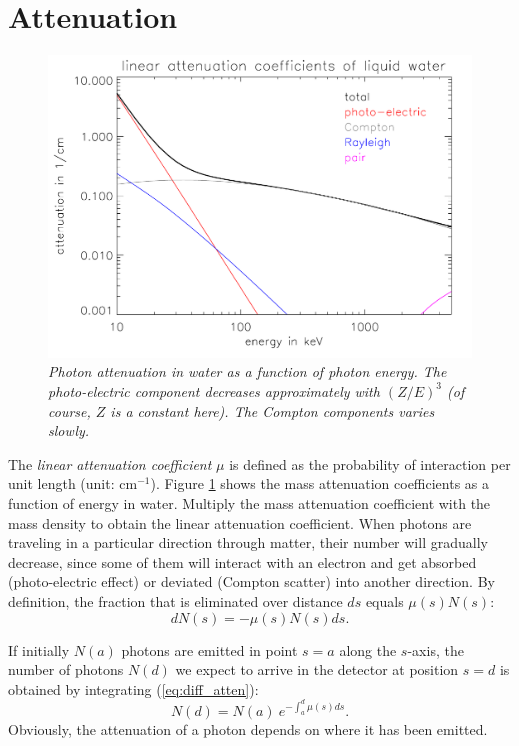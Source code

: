 \section{Attenuation}

\begin{figure}[tb]
\centering
\includegraphics[width=\figmedium]{figs/fig_atten_water.pdf}
\caption{\label{fig:atten_water} \emph{Photon attenuation in water as a
function of photon energy. The photo-electric component decreases
approximately with $(Z/E)^3$ (of course, $Z$ is a constant here). The Compton
components varies slowly.}}
\end{figure}

The {\em linear attenuation coefficient} $\mu$ is defined as the
probability of interaction per unit length (unit: cm$^{-1}$). Figure
\ref{fig:atten_water} shows the mass attenuation coefficients as a
function of energy in water. Multiply the mass attenuation coefficient
with the mass density to obtain the linear attenuation
coefficient. When photons are traveling in a particular direction
through matter, their number will gradually decrease, since some of
them will interact with an electron and get absorbed (photo-electric
effect) or deviated (Compton scatter) into another direction. By
definition, the fraction that is eliminated over distance $ds$ equals
$\mu(s) N(s)$:
\begin{equation}
  dN(s) = - \mu(s) N(s) ds. \label{eq:diff_atten}
\end{equation}

If initially $N(a)$ photons are emitted in point $s = a$ along the $s$-axis,
the number of photons $N(d)$ we expect to arrive in the detector at position
$s = d$ is obtained by integrating (\ref{eq:diff_atten}):
\begin{equation}
  N(d) = N(a) \  e^{- \int_a^d \mu(s) ds}. 
\label{jn:spectatten}
\end{equation}
Obviously, the attenuation of a photon depends on where it has been emitted.

